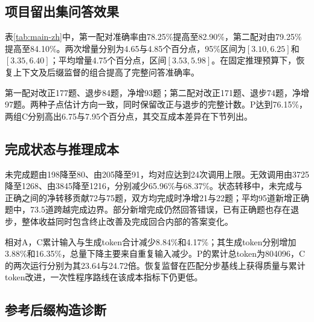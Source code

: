 \subsection{项目留出集问答效果}

\begin{table}[htbp]
\centering\small
\caption{同一2000题项目留出集的问答效果；增量与区间单位为百分点}
\label{tab:main-zh}
\RecoveryMainTableZH
\end{table}

表\ref{tab:main-zh}中，第一配对准确率由78.25\%提高至82.90\%，第二配对由79.25\%提高至84.10\%。两次增量分别为4.65与4.85个百分点，95\%区间为$[3.10,6.25]$和$[3.35,6.40]$；平均增量4.75个百分点，区间$[3.53,5.98]$。在固定推理预算下，恢复上下文及后缀监督的组合提高了完整问答准确率。

第一配对改正177题、退步84题，净增93题；第二配对改正171题、退步74题，净增97题。两种子点估计方向一致，同时保留改正与退步的完整计数。P达到76.15\%，两组C分别高出6.75与7.95个百分点，其交互成本差异在下节列出。

\subsection{完成状态与推理成本}

\begin{table}[htbp]
\centering\small
\caption{项目留出集上的分步执行与累计token成本}
\label{tab:cost-zh}
\RecoveryCostTableZH
\end{table}

未完成题由198降至80、由205降至91，均对应达到24次调用上限。无效调用由3725降至1268、由3845降至1216，分别减少65.96\%与68.37\%。状态转移中，未完成与正确之间的净转移贡献72与75题，双方均完成时净增21与22题；平均95道新增正确题中，73.5道跨越完成边界。部分新增完成仍然回答错误，已有正确题也存在退步，整体收益同时包含终止改善及完成回合内部的答案变化。

相对A，C累计输入与生成token合计减少8.84\%和4.17\%；其生成token分别增加3.88\%和16.35\%，总量下降主要来自重复输入减少。P的累计总token为804096，C的两次运行分别为其23.64与24.72倍。恢复监督在匹配分步基线上获得质量与累计token改进，一次性程序路线在该成本指标下仍更低。

\subsection{参考后缀构造诊断}

\begin{table}[htbp]
\centering\small
\caption{414个可严格比较历史训练配对的离线后缀构造；原418总记录中另4个单列为回放不可比}
\label{tab:construction-zh}
\RecoveryConstructionTableZH
\end{table}

